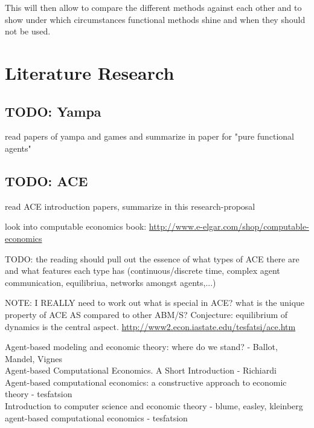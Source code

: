 \documentclass{article}
\begin{document}
This will then allow to compare the different methods against each other and to show under which circumstances functional methods shine and when they should not be used.


\section{Literature Research}

\subsection{TODO: Yampa}
read papers of yampa and games and summarize in paper for "pure functional agents"

\subsection{TODO: ACE}
read ACE introduction papers, summarize in this research-proposal

look into computable economics book: \url{http://www.e-elgar.com/shop/computable-economics}

TODO: the reading should pull out the essence of what types of ACE there are and what features each type has (continuous/discrete time, complex agent communication, equilibriua, networks amongst agents,...)

NOTE: I REALLY need to work out what is special in ACE? what is the unique property of ACE AS compared to other ABM/S? Conjecture: equilibrium of dynamics is the central aspect.
\url{http://www2.econ.iastate.edu/tesfatsi/ace.htm}

\cite{mandel_2015} Agent-based modeling and economic theory: where do we stand? - Ballot, Mandel, Vignes \\
\cite{richiardi_2007} Agent-based Computational Economics. A Short Introduction - Richiardi \\
\cite{tesfatsion_2006} Agent-based computational economics: a constructive approach to economic theory - tesfatsion \\
\cite{kleinberg_easley_2015} Introduction to computer science and economic theory - blume, easley, kleinberg \\
\cite{tesfatsion_2002} agent-based computational economics - tesfatsion 
\end{document}
